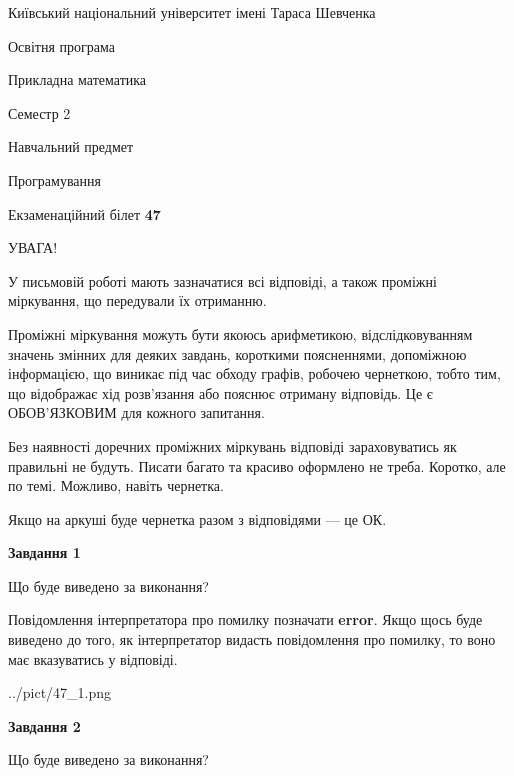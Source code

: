 \documentclass[12pt, ukrainian]{article}
\begin{document}
{{\begin {small}\par
{ \center  Київський національний університет імені Тараса Шевченка \par}
{\parbox {5 cm}{Освітня програма \hfill}{\parbox {7 cm}{Прикладна математика \hfill}}\parbox {6 cm}{\hfill Семестр 2}}\par
{\parbox {5 cm} {Навчальний предмет \hfill}\parbox {7 cm}{Програмування \hfill}\parbox {6cm}{\hfill}\par}\vspace{-7pt} \end{small}}{\center Екзаменаційний білет \No \textbf
{ 47 }\par}}
{
\begin {large}
УВАГА!

У письмовій роботі мають зазначатися всі відповіді, а також проміжні міркування, що передували їх отриманню.

Проміжні міркування можуть бути якоюсь арифметикою, відслідковуванням зна\-чень змінних для деяких завдань,
короткими поясненнями, допоміжною інформацією, що виникає під час обходу графів, робочею чернеткою,
тобто тим, що відображає хід розв’язання або пояснює отриману відповідь.
Це є ОБОВ’ЯЗКОВИМ для кожного запитання.

Без наявності доречних проміжних міркувань відповіді зараховуватись як правиль\-ні не будуть.
Писати багато та красиво оформлено не треба. Коротко, але по темі. Можли\-во, навіть чернетка.

Якщо на аркуші буде чернетка разом з відповідями --- це ОК.

\newpage

{\begin {center}\textbf{Завдання 1}\end {center}}\par
Що буде виведено за виконання?

Повідомлення інтерпретатора про помилку позначати \textbf{error}.
Якщо щось буде виведено до того, як інтерпретатор видасть повідомлення про помилку, 
то воно має вказуватись у відповіді. \par


\begin{center}
	{../pict/47_1.png}
\end{center}
\newpage

{\begin {center}\textbf{Завдання 2}\end {center}}\par
Що буде виведено за виконання?


\end{large}}
\end{document}
